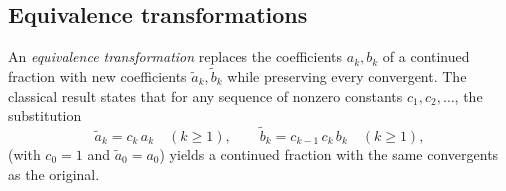 \documentclass{article}
\begin{document}
\subsection*{Equivalence transformations}

An \emph{equivalence transformation} replaces the coefficients $a_k, b_k$ of a continued fraction with new coefficients $\tilde{a}_k, \tilde{b}_k$ while preserving every convergent. The classical result states that for any sequence of nonzero constants $c_1, c_2, \ldots$, the substitution
\begin{equation}
  \tilde{a}_k = c_k\, a_k \quad (k \geq 1), \qquad
  \tilde{b}_k = c_{k-1}\, c_k\, b_k \quad (k \geq 1),
\end{equation}
(with $c_0 = 1$ and $\tilde{a}_0 = a_0$) yields a continued fraction with the same convergents as the original.
\end{document}

